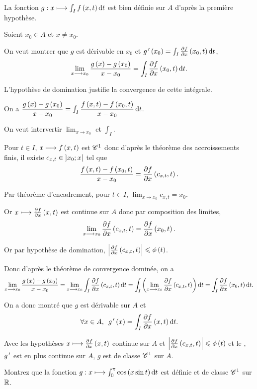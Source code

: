 \begin{dem}
La fonction \(g:x\mapsto\int_If\paren{x,t}\odif{t}\) est bien définie sur \(A\) d'après la première hypothèse.

Soient \(x_0\in A\) et \(x\not=x_0\).

On veut montrer que \(g\) est dérivable en \(x_0\) et \(g\prim\paren{x_0}=\int_I\pdv{f}{x}\paren{x_0,t}\odif{t}\), \ie \[\lim_{x\to x_0}\dfrac{g\paren{x}-g\paren{x_0}}{x-x_0}=\int_I\pdv{f}{x}\paren{x_0,t}\odif{t}.\]

L'hypothèse de domination justifie la convergence de cette intégrale.

On a \(\dfrac{g\paren{x}-g\paren{x_0}}{x-x_0}=\int_I\dfrac{f\paren{x,t}-f\paren{x_0,t}}{x-x_0}\odif{t}\).

On veut intervertir \(\lim_{x\to x_0}\) et \(\int_I\).

Pour \(t\in I\), \(x\longmapsto f\left(x,t\right)\) est \(\mathscr{C}^{1}\) donc d'après le théorème des accroissements finis, il existe \(c_{x,t}\in\left]x_0;x\right[\) tel que \[\dfrac{f\left(x,t\right)-f\left(x_0,t\right)}{x-x_0}=\pdv{f}{x}\left(c_{x,t},t\right).\]

Par théorème d'encadrement, pour \(t\in I\), \(\lim_{x\to x_0}c_{x,t}=x_0\).

Or \(x\longmapsto\pdv{f}{x}\left(x,t\right)\) est continue sur \(A\) donc par composition des limites, \[\lim_{x\longrightarrow x_0}\pdv{f}{x}\left(c_{x,t},t\right)=\pdv{f}{x}\left(x_0,t\right).\]

Or par hypothèse de domination, \(\left\lvert\pdv{f}{x}\left(c_{x,t},t\right)\right\rvert\leqslant\phi\left(t\right)\).

Donc d'après le théorème de convergence dominée, on a \[\lim_{x\to x_0}\dfrac{g\paren{x}-g\paren{x_0}}{x-x_0}=\lim_{x\to x_0}\int_I\pdv{f}{x}\paren{c_{x,t},t}\odif{t}=\int_I\paren{\lim_{x\to x_0}\pdv{f}{x}\paren{c_{x,t},t}}\odif{t}=\int_I\pdv{f}{x}\paren{x_0,t}\odif{t}.\]

On a donc montré que \(g\) est dérivable sur \(A\) et \[\quantifs{\forall x\in A}g\prim\paren{x}=\int_I\pdv{f}{x}\paren{x,t}\odif{t}.\]

Avec les hypothèses \(x\longmapsto\pdv{f}{x}\left(x,t\right)\) continue sur \(A\) et \(\left\lvert\pdv{f}{x}\left(c_{x,t},t\right)\right\rvert\leqslant\phi\left(t\right)\) et le , \(g^{\,\prime}\) est en plus continue sur \(A\), \ie \(g\) est de classe \(\mathscr{C}^{1}\) sur \(A\).
\end{dem}

\begin{exo}
Montrez que la fonction \(g:x\mapsto\int_0^\pi\cos\paren{x\sin t}\odif{t}\) est définie et de classe \(\mathscr{C}^{1}\) sur \(\mathbb{R}\).
\end{exo}


